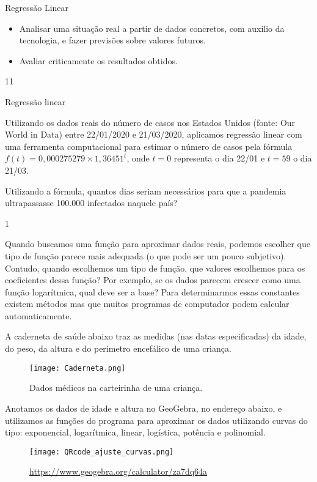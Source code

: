 \begin{objectives}{Regressão Linear}
{
	\begin{itemize}
	\item Analisar uma situação real a partir de dados concretos, com auxilio da tecnologia, e fazer previsões sobre valores futuros.
	\item Avaliar criticamente os resultados obtidos.
	\end{itemize}
}{1}{1}
\end{objectives}
\begin{answer}{Regressão linear}
{
	Utilizando os dados reais do número de casos nos Estados Unidos (fonte: Our World in Data) entre 22/01/2020 e 21/03/2020, aplicamos regressão linear com uma ferramenta computacional para estimar o número de casos pela fórmula $f(t) = 0{,}000275279 \times 1{,}36451^t$, onde $t=0$ representa o dia 22/01 e $t= 59$ o dia 21/03. %

	Utilizando a fórmula, quantos dias seriam necessários para que a pandemia ultrapassasse 100.000 infectados naquele país?
}{1}
\end{answer}



Quando buscamos uma função para aproximar dados reais, podemos escolher que tipo de função parece mais adequada (o que pode ser um pouco subjetivo). Contudo, quando escolhemos um tipo de função, que valores escolhemos para os coeficientes dessa função? Por exemplo, se os dados parecem crescer como uma função logarítmica, qual deve ser a base? Para determinarmos essas constantes existem métodos mas que muitos programas de computador podem calcular automaticamente.

A caderneta de saúde abaixo traz as medidas (nas datas especificadas) da idade, do peso, da altura e do perímetro encefálico de uma criança.

\begin{figure}[H]
\centering

\texttt{[image: Caderneta.png]}
\caption{Dados médicos na carteirinha de uma criança.}
\end{figure}

Anotamos os dados de idade e altura no GeoGebra, no endereço abaixo, e utilizamos as funções do programa para aproximar os dados utilizando curvas do tipo: exponencial, logarítmica, linear, logística, potência e polinomial.

\begin{figure}[H]
\centering

\texttt{[image: QRcode\_ajuste\_curvas.png]}

\url{https://www.geogebra.org/calculator/za7dq64a}
\end{figure}

